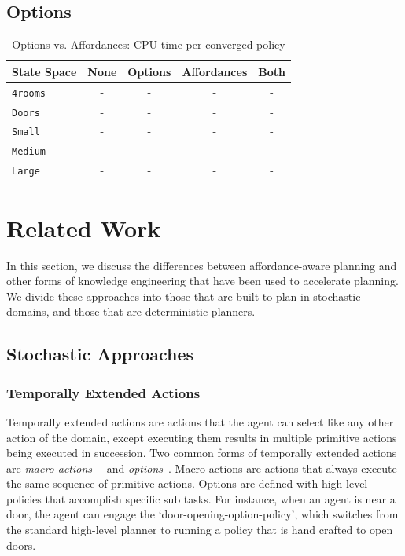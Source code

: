 \documentclass[conference]{IEEEtran}
\begin{document}
\subsection{Options}

\begin{table}[H]
\centering
\begin{tabular}{ l || c c c c }
  State Space 		& None & Options & Affordances & Both 	 	\\ \hline
  \texttt{4rooms}  	& 	-		&	-	&	-	&	-	\\
  \texttt{Doors}  		& 	-		&	-	&	-	&	-	\\
  \texttt{Small}  		& 	-		&	-	&	-	&	-	\\
  \texttt{Medium}  	& 	-		&	-	&	-	&	-	\\
  \texttt{Large}  		& 	-		&	-	&	-	&	-	\\
\end{tabular}
\caption{Options vs. Affordances: CPU time per converged policy}
\label{table:minecraft_results_cpu}
\end{table}


\section{Related Work}
\label{sec:related-work}

In this section, we discuss the differences between
affordance-aware planning and other forms of knowledge engineering that
have been used to accelerate planning. We divide these approaches
into those that are built to plan in stochastic domains, and those that are
deterministic planners.

\subsection{Stochastic Approaches}

\subsubsection{Temporally Extended Actions}
Temporally extended actions are actions that the agent can
select like any other action of the domain, except executing them
results in multiple primitive actions being executed in
succession. Two common forms of temporally extended actions are {\em
  macro-actions}~\cite{hauskrecht98} ~and {\em options}~\cite{sutton99}. 
Macro-actions are actions that always
execute the same sequence of primitive actions. Options are defined
with high-level policies that accomplish specific sub tasks. For
instance, when an agent is near a door, the agent can engage the
`door-opening-option-policy', which switches from the standard
high-level planner to running a policy that is hand crafted to open
doors. 
\end{document}
